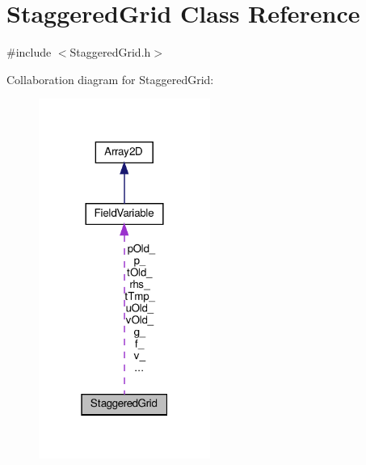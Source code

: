 \hypertarget{classStaggeredGrid}{}\section{Staggered\+Grid Class Reference}
\label{classStaggeredGrid}


{\ttfamily \#include $<$Staggered\+Grid.\+h$>$}



Collaboration diagram for Staggered\+Grid\+:\nopagebreak
\begin{figure}[H]
\begin{center}
\leavevmode
\includegraphics[width=159pt]{classStaggeredGrid__coll__graph}
\end{center}
\end{figure}
